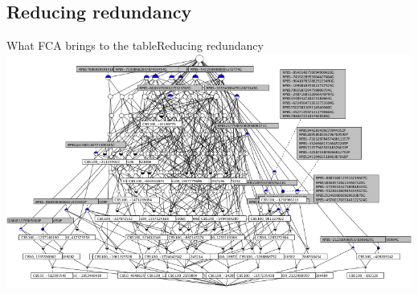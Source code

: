 \subsection{Reducing redundancy}

\begin{frame}{What FCA brings to the table}{Reducing redundancy}
\vspace{0pt}
\centering
\includegraphics[width=\linewidth]{img/fca/lattice_redundancy}
\end{frame}

